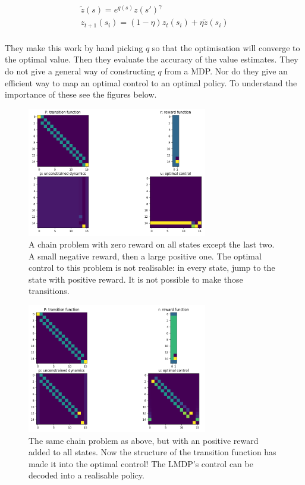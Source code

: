 \begin{align*}
\tilde z(s) = e^{q(s)}z(s{'})^{\gamma} \tag{linearised bellman eqn}\\
z_{t+1}(s_i) = (1- \eta)z_{t}(s_i) + \eta\tilde z(s_i) \tag{$Z$ iteration}\\
\end{align*}

They make this work by hand picking $q$ so that the optimisation will converge to the optimal value.
Then they evaluate the accuracy of the value estimates.
They do not give a general way of constructing $q$ from a MDP.
Nor do they give an efficient way to map an optimal control to an optimal policy.
To understand the importance of these see the figures below.

\begin{figure}
\centering
\includegraphics[width=0.7\textwidth,height=0.35\textheight]{../../pictures/figures/chain-test-zero-rewards.png}
\caption{A chain problem \cite{Sutton2018a} with zero reward on all states except the last two. A small negative reward, then a large positive one.
The optimal control to this problem is not realisable: in every state, jump to the state with positive reward.
It is not possible to make those transitions.}
\end{figure}

\begin{figure}
\centering
\includegraphics[width=0.7\textwidth,height=0.35\textheight]{../../pictures/figures/chain-test-pos-rewards.png}
\caption{The same chain problem as above, but with an positive reward added to all states.
Now the structure of the transition function has made it into the optimal control!
The LMDP's control can be decoded into a realisable policy.}
\end{figure}

